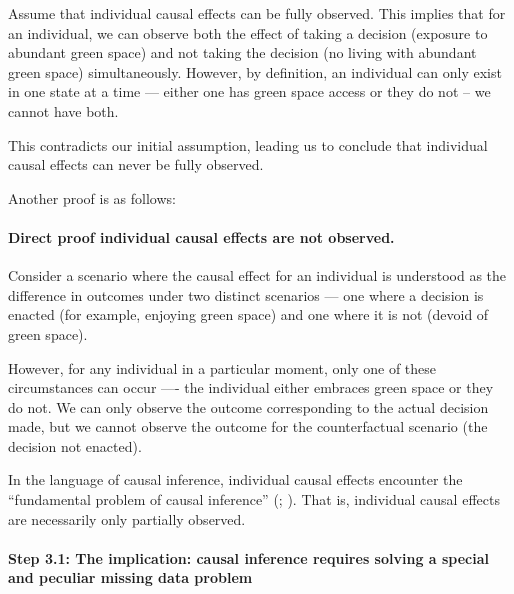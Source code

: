 \documentclass[
  singlecolumn]{article}
\let\oldparagraph\paragraph
\renewcommand{\paragraph}[1]{\oldparagraph{#1}\mbox{}}
\begin{document}
Assume that individual causal effects can be fully observed. This
implies that for an individual, we can observe both the effect of taking
a decision (exposure to abundant green space) and not taking the
decision (no living with abundant green space) simultaneously. However,
by definition, an individual can only exist in one state at a time ---
either one has green space access or they do not -- we cannot have both.

This contradicts our initial assumption, leading us to conclude that
individual causal effects can never be fully observed.

Another proof is as follows:

\paragraph{\texorpdfstring{\textbf{Direct proof individual causal
effects are not
observed.}}{Direct proof individual causal effects are not observed.}}\label{direct-proof-individual-causal-effects-are-not-observed.}

Consider a scenario where the causal effect for an individual is
understood as the difference in outcomes under two distinct scenarios
--- one where a decision is enacted (for example, enjoying green space)
and one where it is not (devoid of green space).

However, for any individual in a particular moment, only one of these
circumstances can occur ---- the individual either embraces green space
or they do not. We can only observe the outcome corresponding to the
actual decision made, but we cannot observe the outcome for the
counterfactual scenario (the decision not enacted).

In the language of causal inference, individual causal effects encounter
the ``fundamental problem of causal inference''
(;
). That is, individual causal
effects are necessarily only partially observed.

\paragraph{\texorpdfstring{\textbf{Step 3.1: The implication: causal
inference requires solving a special and peculiar missing data
problem}}{Step 3.1: The implication: causal inference requires solving a special and peculiar missing data problem}}\label{step-3.1-the-implication-causal-inference-requires-solving-a-special-and-peculiar-missing-data-problem}
\end{document}
